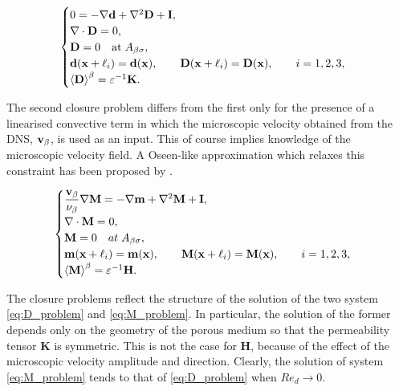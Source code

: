 \begin{eqnarray*}
\begin{cases}
0 = -\nabla \mathbf{d} + \nabla^2 \mathbf{D} +\mathbf{I},\\
\nabla \cdot \mathbf{D} = 0,  \\
\mathbf{D} = 0 \quad \textrm{at} \; A_{\beta \sigma}, \\
\mathbf{d}(\mathbf{x} +\ell_i) = \mathbf{d}(\mathbf{x}), \qquad \mathbf{D}(\mathbf{x} +\ell_i) = \mathbf{D}(\mathbf{x}), \qquad i=1,2,3 , \\
{\left< \mathbf{D} \right>}^{\beta} = \varepsilon^{-1} \mathbf{K}.
\end{cases}
\end{eqnarray*}

The second closure problem differs from the first only for the presence of a linearised convective term 
in which the microscopic velocity obtained from the DNS, $\textbf{v}_{\beta}$, is used as an input.  This of course implies knowledge of the microscopic velocity field. A Oseen-like approximation which relaxes this constraint has been proposed by \citet{zampogna}.

\begin{eqnarray*}
\begin{cases}
\dfrac{\textbf{v}_{\beta}}{\nu_{\beta}} \nabla \mathbf{M} = -\nabla \mathbf{m} + \nabla^2 \mathbf{M} +\mathbf{I},\\
\nabla \cdot \mathbf{M} = 0,  \\
\mathbf{M} = 0 \quad at \; A_{\beta \sigma}, \\
\mathbf{m}(\mathbf{x} +\ell_i) = \mathbf{m}(\mathbf{x}), \qquad \mathbf{M}(\mathbf{x} +\ell_i) = \mathbf{M}(\mathbf{x}), \qquad i=1,2,3 ,\\
{\left< \mathbf{M} \right>}^{\beta} = \varepsilon^{-1} \mathbf{H}.
\end{cases}
\label{eq:h_model}
\end{eqnarray*}


The closure problems reflect the structure of the solution of the two system \eqref{eq:D_problem} and \eqref{eq:M_problem}. In particular, the solution of the former depends only on the geometry of the porous medium so that the permeability tensor $\mathbf{K}$ is symmetric. This is not the case for $\mathbf{H}$, because of the effect of the microscopic velocity amplitude and direction.  Clearly, the solution of system \eqref{eq:M_problem} tends to that of \eqref{eq:D_problem} when $Re_d \rightarrow 0$. 


